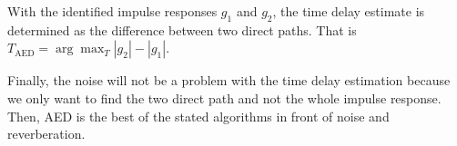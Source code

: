   With the identified impulse responses $g_1$ and $g_2$, the time delay estimate is determined as the difference between two direct paths. That is $T_{\text{AED}} = \arg\max_T |g_2|-|g_1|$. 

  Finally, the noise will not be a problem with the time delay estimation because we only want to find the two direct path and not the whole impulse response. Then, AED is the best of the stated algorithms in front of noise and reverberation. 
